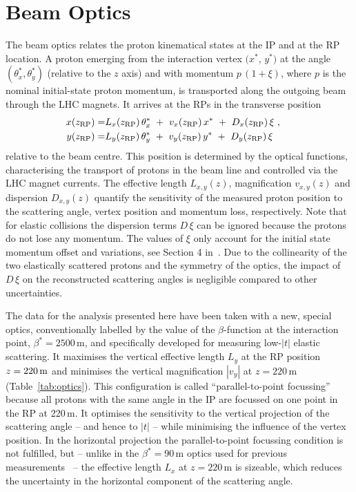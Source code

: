 \section{Beam Optics}
\label{sec:beam optics}

The beam optics relates the proton kinematical states at the IP and at the RP location. A proton emerging from the interaction vertex $(x^*$, $y^*)$ at the angle $(\theta_x^*,\theta_y^*)$ (relative to the $z$ axis) and with momentum $p\,(1+\xi)$, where $p$ is the nominal initial-state proton momentum, is transported along the outgoing beam through the LHC magnets. It arrives at the RPs in the transverse position
\begin{equation}
\label{eq:prot trans}
	\begin{aligned}
		x(z_{\rm RP}) =& L_x(z_{\rm RP})\, \theta_x^*\ +\ v_x(z_{\rm RP})\, x^*\ +\ D_x(z_{\rm RP})\, \xi\ ,\cr
		y(z_{\rm RP}) =& L_y(z_{\rm RP})\, \theta_y^*\ +\ v_y(z_{\rm RP})\, y^*\ +\ D_y(z_{\rm RP})\, \xi \quad
	\end{aligned}
\end{equation}
relative to the beam centre. This position is determined by the optical functions, characterising the transport of protons in the beam line and controlled via the LHC magnet currents.
The effective length $L_{x,y}(z)$, magnification $v_{x,y}(z)$ and dispersion $D_{x,y}(z)$ quantify the sensitivity of the measured proton position to the scattering angle, vertex position and momentum loss, respectively. Note that for elastic collisions the dispersion terms $D\,\xi$ can be ignored because the protons do not lose any momentum. The values of $\xi$ only account for the initial state momentum offset and variations, see Section 4 in~\cite{8tev-90m}. Due to the collinearity of the two elastically scattered protons and the symmetry of the optics, the impact of $D\,\xi$ on the reconstructed scattering angles is negligible compared to other uncertainties. %



The data for the analysis presented here have been taken with a new, special optics, conventionally labelled by the value of the $\beta$-function at the interaction point, $\beta^{*} = 2500\,$m, and specifically developed for measuring low-$|t|$ elastic scattering. It maximises the vertical effective length $L_{y}$ at the RP position $z = 220\,{\rm m}$ and minimises the vertical magnification $|v_{y}|$ at $z = 220\,$m (Table~\ref{tab:optics}). This configuration is called ``parallel-to-point focussing'' because all protons with the same angle in the IP are focussed on one point in the RP at 220\,m. It optimises the sensitivity to the vertical projection of the scattering angle -- and hence to $|t|$ -- while minimising the influence of the vertex position. In the horizontal projection the parallel-to-point focussing condition is not fulfilled, but -- unlike in the $\beta^{*} = 90\,$m optics used for previous measurements~\cite{epl96,epl101-el,epl101-tot,prl111} -- the effective length $L_{x}$ at $z = 220\,$m is sizeable, which reduces the uncertainty in the horizontal component of the scattering angle.

